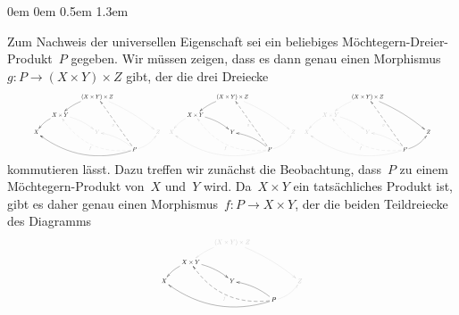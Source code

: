 \documentclass[a4paper,ngerman]{scrartcl}
\theoremstyle{definition}
\theoremstyle{plain}
\theoremstyle{remark}
\begin{document}
\begin{list}{}{0em \leftmargin0em \itemindent0.5em \itemsep 1.3em}
\begin{enumerate}
\newcommand{\hil}[1]{\color{black}{#1}}

Zum Nachweis der universellen Eigenschaft sei ein beliebiges
Möchtegern-Dreier-Produkt~$P$ gegeben. Wir müssen zeigen, dass es dann genau
einen Morphismus~$g : P \to (X \times Y) \times Z$ gibt, der die drei Dreiecke
\begin{equation}\label{diags}
  \scalebox{0.45}{\color{grey}{
    $\vcenter{\xymatrix@=4ex{
      && \hil{(X \times Y) \times Z} \ar@/_/@[black][dl] \ar@/^/[ddrr] \\
     & \hil{X \times Y} \ar@/_/@[black][ld] \ar@/^/[rd] && \text{$\phantom{X \times Y}$} \\
     \hil{X} && Y && Z \\
     &&& \hil{P}
      \ar@/^2pc/@{-->}[lluu]^f
      \ar@/^2pc/@[black][lllu] \ar@/_/[lu] \ar@/_/[ru]
      \ar@{-->}@[black][luuu]^g
    }}
    \quad
    \vcenter{\xymatrix@=4ex{
      && \hil{(X \times Y) \times Z} \ar@/_/@[black][dl] \ar@/^/[ddrr] \\
     & \hil{X \times Y} \ar@/_/[ld] \ar@/^/@[black][rd] && \text{$\phantom{X \times Y}$} \\
     X && \hil{Y} && Z \\
     &&& \hil{P}
      \ar@/^2pc/@{-->}[lluu]^f
      \ar@/^2pc/[lllu] \ar@/_/@[black][lu] \ar@/_/[ru]
      \ar@{-->}@[black][luuu]^g
    }}
    \quad
    \vcenter{\xymatrix@=4ex{
      && \hil{(X \times Y) \times Z} \ar@/_/[dl] \ar@/^/@[black][ddrr] \\
     & X \times Y \ar@/_/[ld] \ar@/^/[rd] && \text{$\phantom{X \times Y}$} \\
     X && Y && \hil{Z} \\
     &&& \hil{P}
      \ar@/^2pc/@{-->}[lluu]^f
      \ar@/^2pc/[lllu] \ar@/_/[lu] \ar@/_/@[black][ru]
      \ar@{-->}@[black][luuu]^g
    }}$
  }}
\end{equation}
kommutieren lässt. Dazu treffen wir zunächst die Beobachtung, dass~$P$ zu einem
Möchtegern-Produkt von~$X$ und~$Y$ wird. Da~$X \times Y$ ein tatsächliches
Produkt ist, gibt es daher genau einen Morphismus~$f: P \to X \times Y$, der
die beiden Teildreiecke des Diagramms
\[
  \scalebox{0.5}{\color{grey}{\xymatrix@=4ex{
    && (X \times Y) \times Z \ar@/_/[dl] \ar@/^/[ddrr] \\
   & \hil{X \times Y} \ar@/_/@[black][ld] \ar@/^/@[black][rd] && \text{$\phantom{X \times Y}$} \\
   \hil{X} && \hil{Y} && Z \\
   &&& \hil{P}
    \ar@/^2pc/@{-->}@[black][lluu]^f
    \ar@/^2pc/@[black][lllu] \ar@/_/@[black][lu] \ar@/_/[ru]
}}}\]
\end{enumerate}
\end{list}
\end{document}
